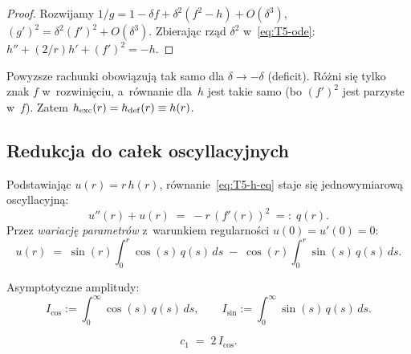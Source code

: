 \begin{proof}
Rozwijamy $1/g = 1 - \delta f + \delta^2(f^2 - h) + O(\delta^3)$,
$(g')^2 = \delta^2(f')^2 + O(\delta^3)$.
Zbieraj\k{a}c rz\k{a}d $\delta^2$ w~\eqref{eq:T5-ode}: $h'' + (2/r)h' + (f')^2 = -h$.
\end{proof}

\begin{remark}
Powyzsze rachunki obowi\k{a}zuj\k{a} tak samo dla $\delta \to -\delta$
(deficit). R\'o\.zni si\k{e} tylko znak $f$ w~rozwini\k{e}ciu, a~r\'ownanie
dla~$h$ jest takie samo (bo $(f')^2$ jest parzyste w~$f$).
Zatem $h_{\rm exc}(r) = h_{\rm def}(r) \equiv h(r)$.
\end{remark}

\subsection{Redukcja do ca\l{}ek oscyllacyjnych}
\label{app:T5-integrals}

Podstawiaj\k{a}c $u(r) = r\, h(r)$, r\'ownanie~\eqref{eq:T5-h-eq}
staje si\k{e} jednowymiarow\k{a} oscyllacyjn\k{a}:
\begin{equation}\label{eq:T5-u-eq}
  u''(r) + u(r) \;=\; -r\,(f'(r))^2 \;=:\; q(r).
\end{equation}
Przez \emph{wariacj\k{e} parametr\'ow} z~warunkiem regularno\'sci
$u(0) = u'(0) = 0$:
\begin{equation}\label{eq:T5-u-sol}
  u(r) \;=\; \sin(r)\!\int_0^r \cos(s)\,q(s)\,ds \;-\; \cos(r)\!\int_0^r \sin(s)\,q(s)\,ds.
\end{equation}

Asymptotyczne amplitudy:
\begin{equation}\label{eq:T5-I-def}
  I_{\cos} := \int_0^\infty \cos(s)\,q(s)\,ds,
  \qquad
  I_{\sin} := \int_0^\infty \sin(s)\,q(s)\,ds.
\end{equation}

\begin{proposition}\label{prop:T5-c1-Icos}
\begin{equation}\label{eq:T5-c1-Icos}
  c_1 \;=\; 2\, I_{\cos}.
\end{equation}
\end{proposition}

